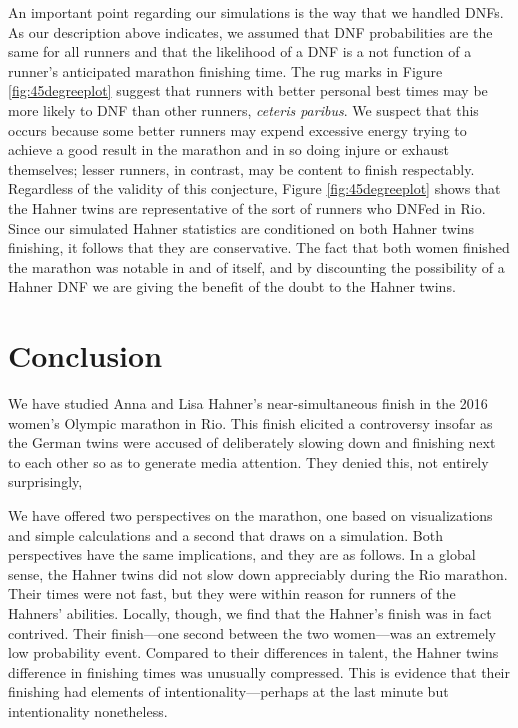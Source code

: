 \documentclass[12pt,titlepage]{article}
\begin{document}
An important point regarding our simulations is the way that we
handled DNFs. As our description above indicates, we assumed that DNF
probabilities are the same for all runners and that the likelihood of
a DNF is a not function of a runner's anticipated marathon finishing
time. The rug marks in Figure \ref{fig:45degreeplot} suggest that
runners with better personal best times may be more likely to DNF than
other runners, \emph{ceteris paribus}. We suspect that this occurs
because some better runners may expend excessive energy trying to
achieve a good result in the marathon and in so doing injure or
exhaust themselves; lesser runners, in contrast, may be content to
finish respectably. Regardless of the validity of this conjecture,
Figure \ref{fig:45degreeplot} shows that the Hahner twins are
representative of the sort of runners who DNFed in Rio. Since our
simulated Hahner statistics are conditioned on both Hahner twins
finishing, it follows that they are conservative. The fact that both
women finished the marathon was notable in and of itself, and by
discounting the possibility of a Hahner DNF we are giving the benefit
of the doubt to the Hahner twins.

\section*{Conclusion}

We have studied Anna and Lisa Hahner's near-simultaneous finish in the
2016 women's Olympic marathon in Rio. This finish elicited a
controversy insofar as the German twins were accused of deliberately
slowing down and finishing next to each other so as to generate media
attention. They denied this, not entirely surprisingly,

We have offered two perspectives on the marathon, one based on
visualizations and simple calculations and a second that draws on a
simulation. Both perspectives have the same implications, and they are
as follows. In a global sense, the Hahner twins did not slow down
appreciably during the Rio marathon. Their times were not fast, but
they were within reason for runners of the Hahners' abilities.
Locally, though, we find that the Hahner's finish was in fact
contrived. Their finish---one second between the two women---was an
extremely low probability event. Compared to their differences in
talent, the Hahner twins difference in finishing times was unusually
compressed. This is evidence that their finishing had elements of
intentionality---perhaps at the last minute but intentionality
nonetheless.
\end{document}
